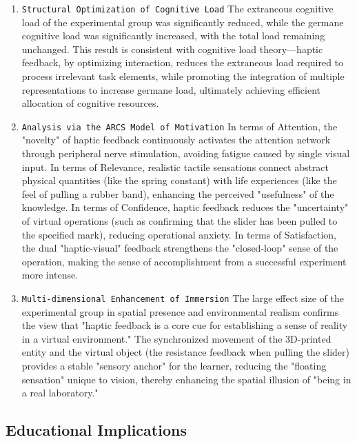 \documentclass[runningheads]{llncs}
\begin{document}
\begin{enumerate}[label={\arabic*)}]
 \item \texttt{Structural Optimization of Cognitive Load} The extraneous cognitive load of the experimental group was significantly reduced, while the germane cognitive load was significantly increased, with the total load remaining unchanged. This result is consistent with cognitive load theory—haptic feedback, by optimizing interaction, reduces the extraneous load required to process irrelevant task elements, while promoting the integration of multiple representations to increase germane load, ultimately achieving efficient allocation of cognitive resources.
 \item \texttt{Analysis via the ARCS Model of Motivation} In terms of Attention, the "novelty" of haptic feedback continuously activates the attention network through peripheral nerve stimulation, avoiding fatigue caused by single visual input. In terms of Relevance, realistic tactile sensations connect abstract physical quantities (like the spring constant) with life experiences (like the feel of pulling a rubber band), enhancing the perceived "usefulness" of the knowledge. In terms of Confidence, haptic feedback reduces the "uncertainty" of virtual operations (such as confirming that the slider has been pulled to the specified mark), reducing operational anxiety. In terms of Satisfaction, the dual "haptic-visual" feedback strengthens the "closed-loop" sense of the operation, making the sense of accomplishment from a successful experiment more intense.
 \item \texttt{Multi-dimensional Enhancement of Immersion} The large effect size of the experimental group in spatial presence and environmental realism confirms the view that "haptic feedback is a core cue for establishing a sense of reality in a virtual environment." The synchronized movement of the 3D-printed entity and the virtual object (the resistance feedback when pulling the slider) provides a stable "sensory anchor" for the learner, reducing the "floating sensation" unique to vision, thereby enhancing the spatial illusion of "being in a real laboratory."
\end{enumerate}

\subsection{Educational Implications}
\end{document}
